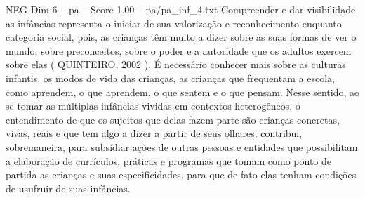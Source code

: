 \begin{textsample}{NEG Dim 6 – pa – Score 1.00 – pa/pa\_inf\_4.txt}
Compreender e dar visibilidade as infâncias representa o iniciar de sua valorização e reconhecimento enquanto categoria social, pois, as crianças têm muito a dizer sobre as suas formas de ver o mundo, sobre preconceitos, sobre o poder e a autoridade que os adultos exercem sobre elas ( QUINTEIRO, 2002 ).
É necessário conhecer mais sobre as culturas infantis, os modos de vida das crianças, as crianças que frequentam a escola, como aprendem, o que aprendem, o que sentem e o que pensam.
Nesse sentido, ao se tomar as múltiplas infâncias vividas em contextos heterogêneos, o entendimento de que os sujeitos que delas fazem parte são crianças concretas, vivas, reais e que tem algo a dizer a partir de seus olhares, contribui, sobremaneira, para subsidiar ações de outras pessoas e entidades que possibilitam a elaboração de currículos, práticas e programas que tomam como ponto de partida as crianças e suas especificidades, para que de fato elas tenham condições de usufruir de suas infâncias.

\end{textsample}
